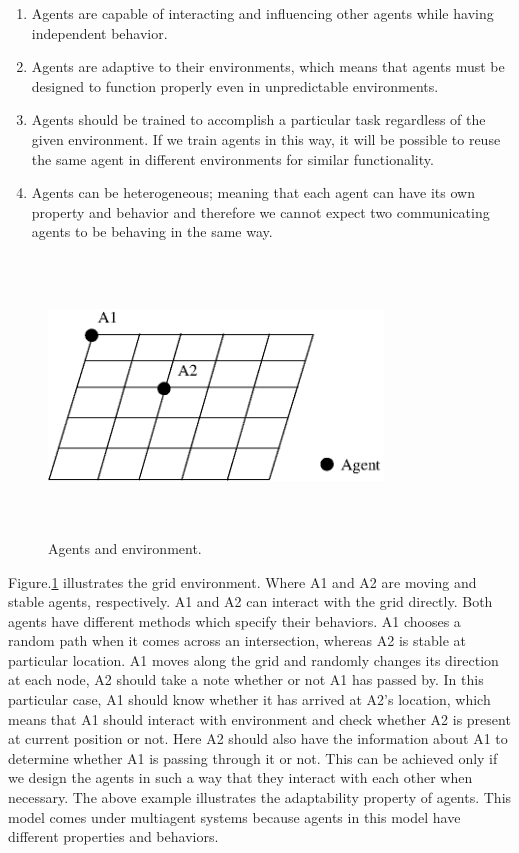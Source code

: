 \begin{enumerate} 
\item Agents are capable of interacting and influencing other agents while having independent behavior.
\item Agents are adaptive to their environments, which means that agents must be designed to function properly even in unpredictable environments. 
\item Agents should be trained to accomplish a particular task regardless of the given environment. If we train agents in this way, it will be possible to reuse the same agent in different environments for similar functionality.
\item Agents can be heterogeneous; meaning that each agent can have its own property and behavior and therefore we cannot expect two communicating agents to be behaving in the same way.
\end{enumerate} 

\vspace{5mm}

\begin{figure}[H]
\vspace{5mm}
\centering
\includegraphics[height=2.9in, width=3.5in]{noc.eps}
\caption{Agents and environment.}
\label{fig:3.2}
\vspace{10mm}
\end{figure}

Figure.\ref{fig:3.2} illustrates the grid environment. Where A1 and A2 are moving and stable agents, respectively. A1 and A2 can interact with the grid directly. Both agents have different methods which specify their behaviors. A1 chooses a random path when it comes across an intersection, whereas A2 is stable at particular location. A1 moves along the grid and randomly changes its direction at each node, A2 should take a note whether or not A1 has passed by. In this particular case, A1 should know whether it has arrived at A2's location, which means that A1 should interact with environment and check whether A2 is present at current position or not. Here A2 should also have the information about A1 to determine whether A1 is passing through it or not. This can be achieved only if we design the agents in such a way that they interact with each other when necessary. The above example illustrates the adaptability property of agents. This model comes under multiagent systems because agents in this model have different properties and behaviors. 

